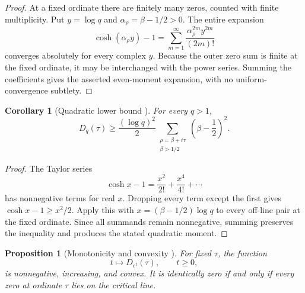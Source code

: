 \documentclass[11pt]{amsart}
\numberwithin{equation}{section}
\theoremstyle{plain}
\newtheorem{proposition}[theorem]{Proposition}
\newtheorem{corollary}[theorem]{Corollary}
\theoremstyle{definition}
\theoremstyle{remark}
\newcommand{\1}{\mathbf{1}}
\begin{document}
\begin{proof}
At a fixed ordinate there are finitely many zeros, counted with finite
multiplicity.  Put \(y=\log q\) and
\(\alpha_\rho=\beta-1/2>0\).  The entire expansion
\begin{equation}
\cosh(\alpha_\rho y)-1
=
\sum_{m=1}^{\infty}
\frac{\alpha_\rho^{2m}y^{2m}}{(2m)!}
\label{eq:Dq_cosh_series_proof}
\end{equation}
converges absolutely for every complex \(y\).  Because the outer zero sum
is finite at the fixed ordinate, it may be interchanged with the power
series.  Summing the coefficients gives the asserted even-moment
expansion, with no uniform-convergence subtlety.
\end{proof}


\begin{corollary}[Quadratic lower bound {}]
\label{cor:Dq_quadratic_lower}
For every $q>1$,
\begin{equation}
D_q(\tau)
\geq
\frac{(\log q)^2}{2}
\sum_{\substack{\rho=\beta+i\tau\\\beta>1/2}}
\left(\beta-\frac12\right)^2.
\label{eq:Dq_quadratic_lower}
\end{equation}
\end{corollary}

\begin{proof}
The Taylor series
\begin{equation}
\cosh x-1
=
\frac{x^2}{2!}+\frac{x^4}{4!}+\cdots
\label{eq:cosh_nonnegative_series}
\end{equation}
has nonnegative terms for real \(x\).  Dropping every term except the first
gives \(\cosh x-1\geq x^2/2\).  Apply this with
\(x=(\beta-1/2)\log q\) to every off-line pair at the fixed ordinate.
Since all summands remain nonnegative, summing preserves the inequality and
produces the stated quadratic moment.
\end{proof}


\begin{proposition}[Monotonicity and convexity {}]
\label{prop:Dq_monotonicity}
For fixed $\tau$, the function
\begin{equation}
t\longmapsto D_{e^t}(\tau),
\qquad t\geq0,
\label{eq:D_exp_t}
\end{equation}
is nonnegative, increasing, and convex.  It is identically zero if and only
if every zero at ordinate $\tau$ lies on the critical line.
\end{proposition}
\end{document}
